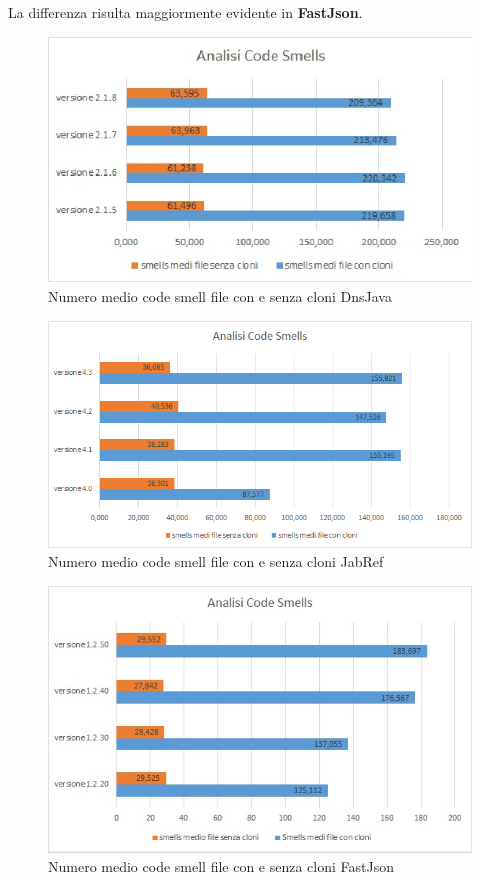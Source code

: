 La differenza risulta maggiormente evidente in \textbf{FastJson}.
\begin{figure}[h]
	\centering
	\includegraphics[scale=0.7, trim = 0cm 0cm 0cm 0cm, clip=true]{Grafici_dnsJava/CodeSmells.jpg}
	\caption{Numero medio code smell file con e senza cloni DnsJava}
	\label{fig:codeSmellDnsJava}	
\end{figure}
\begin{figure}[h]
	\centering
	\includegraphics[scale=0.7, trim = 0cm 0cm 0cm 0cm, clip=true]{Grafici_jabRef/CodeSmells.png}
	\caption{Numero medio code smell file con e senza cloni JabRef}
	\label{fig:codeSmellJabRef}
\end{figure}
\begin{figure}[h]
	\centering
	\includegraphics[scale=0.7, trim = 0cm 0cm 0cm 0cm, clip=true]{Grafici_fastJson/CodeSmell.jpg}
	\caption{Numero medio code smell file con e senza cloni FastJson}
	\label{fig:codeSmellFastjson}
\end{figure}
